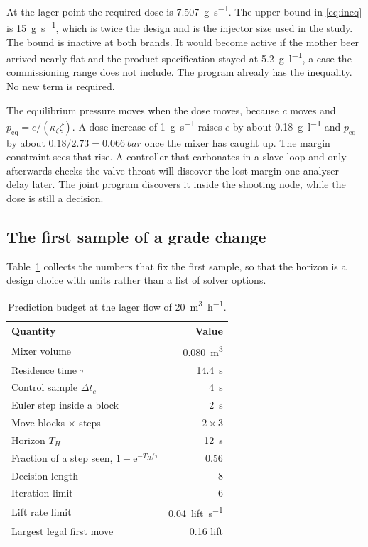 At the lager point the required dose is \SI{7.507}{\gram\per\second}. The upper bound in \eqref{eq:ineq} is \SI{15}{\gram\per\second}, which is twice the design and is the injector size used in the study. The bound is inactive at both brands. It would become active if the mother beer arrived nearly flat and the product specification stayed at \SI{5.2}{\gram\per\litre}, a case the commissioning range does not include. The program already has the inequality. No new term is required.

The equilibrium pressure moves when the dose moves, because $c$ moves and $p_{\mathrm{eq}}=c/(\kappa_\zeta\zeta)$. A dose increase of \SI{1}{\gram\per\second} raises $c$ by about \SI{0.18}{\gram\per\litre} and $p_{\mathrm{eq}}$ by about $0.18/2.73=\SI{0.066}{bar}$ once the mixer has caught up. The margin constraint sees that rise. A controller that carbonates in a slave loop and only afterwards checks the valve throat will discover the lost margin one analyser delay later. The joint program discovers it inside the shooting node, while the dose is still a decision.

\subsection{The first sample of a grade change}
\label{sec:firstsample}

Table~\ref{tab:horizon} collects the numbers that fix the first sample, so that the horizon is a design choice with units rather than a list of solver options.

\begin{table}[htbp]
\centering
\caption{Prediction budget at the lager flow of \SI{20}{\cubic\metre\per\hour}.}
\label{tab:horizon}
\begin{tabular}{lr}\toprule
Quantity & Value \\\midrule
Mixer volume & \SI{0.080}{\cubic\metre} \\
Residence time $\tau$ & \SI{14.4}{\second} \\
Control sample $\Delta t_c$ & \SI{4}{\second} \\
Euler step inside a block & \SI{2}{\second} \\
Move blocks $\times$ steps & $2\times 3$ \\
Horizon $T_H$ & \SI{12}{\second} \\
Fraction of a step seen, $1-\mathrm{e}^{-T_H/\tau}$ & 0.56 \\
Decision length & 8 \\
Iteration limit & 6 \\
Lift rate limit & \SI{0.04}{lift\per\second} \\
Largest legal first move & 0.16 lift \\
\bottomrule\end{tabular}
\end{table}

